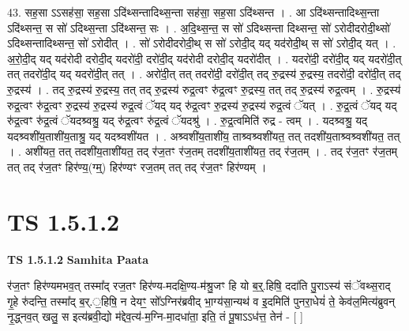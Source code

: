 \documentclass[17pt]{extarticle}
\begin{document}
43. सह॒सा ऽऽसह॑सा॒ सह॒सा ऽदि॑थ्सन्तादिथ्स॒न्ता सह॑सा॒ सह॒सा ऽदि॑थ्सन्त । . आ ऽदि॑थ्सन्तादिथ्स॒न्ता ऽदि॑थ्सन्त॒ स सो॑ ऽदिथ्स॒न्ता ऽदि॑थ्सन्त॒ सः । . अ॒दि॒थ्स॒न्त॒ स सो॑ ऽदिथ्सन्ता दिथ्सन्त॒ सो॑ ऽरोदीदरोदी॒थ्सो॑ ऽदिथ्सन्तादिथ्सन्त॒ सो॑ ऽरोदीत् । . सो॑ ऽरोदीदरोदी॒थ् स सो॑ ऽरोदी॒द् यद् यद॑रोदी॒थ् स सो॑ ऽरोदी॒द् यत् । . अ॒रो॒दी॒द् यद् यद॑रोदी दरोदी॒द् यदरो॑दी॒ दरो॑दी॒द् यद॑रोदी दरोदी॒द् यदरो॑दीत् । . यदरो॑दी॒ दरो॑दी॒द् यद् यदरो॑दी॒त् तत् तदरो॑दी॒द् यद् यदरो॑दी॒त् तत् । . अरो॑दी॒त् तत् तदरो॑दी॒ दरो॑दी॒त् तद् रु॒द्रस्य॑ रु॒द्रस्य॒ तदरो॑दी॒ दरो॑दी॒त् तद् रु॒द्रस्य॑ । . तद् रु॒द्रस्य॑ रु॒द्रस्य॒ तत् तद् रु॒द्रस्य॑ रुद्र॒त्वꣳ रु॑द्र॒त्वꣳ रु॒द्रस्य॒ तत् तद् रु॒द्रस्य॑ रुद्र॒त्वम् । . रु॒द्रस्य॑ रुद्र॒त्वꣳ रु॑द्र॒त्वꣳ रु॒द्रस्य॑ रु॒द्रस्य॑ रुद्र॒त्वं ॅयद् यद् रु॑द्र॒त्वꣳ रु॒द्रस्य॑ रु॒द्रस्य॑ रुद्र॒त्वं ॅयत् । . रु॒द्र॒त्वं ॅयद् यद् रु॑द्र॒त्वꣳ रु॑द्र॒त्वं ॅयदश्र्वश्रु॒ यद् रु॑द्र॒त्वꣳ रु॑द्र॒त्वं ॅयदश्रु॑ । . रु॒द्र॒त्वमिति॑ रुद्र - त्वम् । . यदश्र्वश्रु॒ यद् यदश्र्वशी॑य॒ताशी॑य॒ताश्रु॒ यद् यदश्र्वशी॑यत । . अश्र्वशी॑य॒ताशी॑य॒ ताश्र्वश्र्वशी॑यत॒ तत् तदशी॑य॒ताश्र्वश्र्वशी॑यत॒ तत् । . अशी॑यत॒ तत् तदशी॑य॒ताशी॑यत॒ तद् र॑ज॒तꣳ र॑ज॒तम् तदशी॑य॒ताशी॑यत॒ तद् र॑ज॒तम् । . तद् र॑ज॒तꣳ र॑ज॒तम् तत् तद् र॑ज॒तꣳ हिर॑ण्य॒(ग्म्॒) हिर॑ण्यꣳ रज॒तम् तत् तद् र॑ज॒तꣳ हिर॑ण्यम् । \newline
\pagebreak
{}
\section*{ TS 1.5.1.2 }

\textbf{TS 1.5.1.2 } \newline
\textbf{Samhita Paata} \newline

र॑ज॒तꣳ हिर॑ण्यमभव॒त् तस्मा᳚द् रज॒तꣳ हिर॑ण्य-मदक्षि॒ण्य-म॑श्रु॒जꣳ हि यो ब॒र्॒.हिषि॒ ददा॑ति पु॒राऽस्य॑ संॅवथ्स॒राद् गृ॒हे रु॑दन्ति॒ तस्मा᳚द् ब॒र्.॒हिषि॒ न देयꣳ॒॒ सो᳚ऽग्निर॑ब्रवीद् भा॒ग्य॑सा॒न्यथ॑ व इ॒दमिति॑ पुनरा॒धेयं॑ ते॒ केव॑ल॒मित्य॑ब्रुवन् नृ॒द्ध्नव॒त् खलु॒ स इत्य॑ब्रवी॒द्यो म॑द्देव॒त्य॑-म॒ग्नि-मा॒दधा॑ता॒ इति॒ तं पू॒षाऽऽध॑त्त॒ तेन॑ - [ ] \newline
\end{document}
